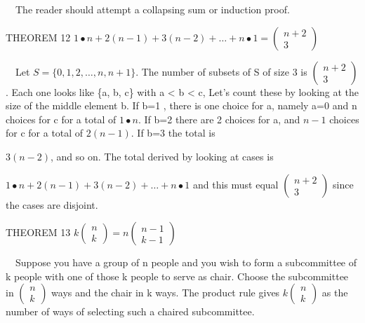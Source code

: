 \documentclass{article}
\begin{document}
\ \ The reader should attempt a collapsing sum or induction proof. 

THEOREM 12  
$1{\bullet}n+2\left(n-1\right)+3\left(n-2\right)+{\dots}+n{\bullet}1=\left(\begin{matrix}n+2\\3\end{matrix}\right)$

\ \ Let  $S=\{0,1,2,{\dots},n,n+1\}$.  The number of subsets of S of size 3 is 
$\left(\begin{matrix}n+2\\3\end{matrix}\right)$.  Each one looks like \{a, b, c\} with a {\textless} b {\textless} c,
Let’s count these by looking at the size of the middle element  b.  If b=1 , there is one choice for a, namely a=0 and 
n  choices for  c  for a total of  $1{\bullet}n$.  If b=2 there are 2 choices for a, and  $n-1$ choices for c for a
total of  $2(n-1)$.  If b=3 the total is

  $3(n-2)$, and so on. The total derived by looking at cases is 

 $1{\bullet}n+2\left(n-1\right)+3\left(n-2\right)+{\dots}+n{\bullet}1$ and this must equal 
$\left(\begin{matrix}n+2\\3\end{matrix}\right)$ since the cases are disjoint.

THEOREM 13   $k\left(\begin{matrix}n\\k\end{matrix}\right)=n\left(\begin{matrix}n-1\\k-1\end{matrix}\right)$

\ \ Suppose you have a group of  n  people and you wish to form a subcommittee of  k  people with one of those k  people
to serve as chair. Choose the subcommittee in  $\left(\begin{matrix}n\\k\end{matrix}\right)$ ways and the chair in  k 
ways. The product rule gives $k\left(\begin{matrix}n\\k\end{matrix}\right)$ as the number of ways of selecting such a
chaired subcommittee.
\end{document}
